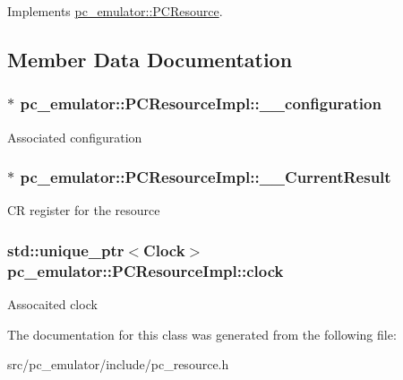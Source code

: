 Implements \hyperlink{classpc__emulator_1_1PCResource_a511c581ba122a73010f836c84947f332}{pc\+\_\+emulator\+::\+P\+C\+Resource}.



\subsection{Member Data Documentation}
\subsubsection[{\texorpdfstring{\+\_\+\+\_\+configuration}{__configuration}}]{$\ast$ pc\+\_\+emulator\+::\+P\+C\+Resource\+Impl\+::\+\_\+\+\_\+configuration}\hypertarget{classpc__emulator_1_1PCResourceImpl_a356a5f4a62005c9aee4f6ef8538ced11}{}\label{classpc__emulator_1_1PCResourceImpl_a356a5f4a62005c9aee4f6ef8538ced11}
Associated configuration 
\subsubsection[{\texorpdfstring{\+\_\+\+\_\+\+Current\+Result}{__CurrentResult}}]{$\ast$ pc\+\_\+emulator\+::\+P\+C\+Resource\+Impl\+::\+\_\+\+\_\+\+Current\+Result}\hypertarget{classpc__emulator_1_1PCResourceImpl_a3648237ffd6fc0c0d569b18f7142154f}{}\label{classpc__emulator_1_1PCResourceImpl_a3648237ffd6fc0c0d569b18f7142154f}
CR register for the resource 
\subsubsection[{\texorpdfstring{clock}{clock}}]{\setlength{\rightskip}{0pt plus 5cm}std\+::unique\+\_\+ptr$<${\bf Clock}$>$ pc\+\_\+emulator\+::\+P\+C\+Resource\+Impl\+::clock}\hypertarget{classpc__emulator_1_1PCResourceImpl_ad49b0d4eb79f506f03f37518e1e70d1e}{}\label{classpc__emulator_1_1PCResourceImpl_ad49b0d4eb79f506f03f37518e1e70d1e}
Assocaited clock 

The documentation for this class was generated from the following file\+:\begin{DoxyCompactItemize}
\item 
src/pc\+\_\+emulator/include/pc\+\_\+resource.\+h\end{DoxyCompactItemize}
